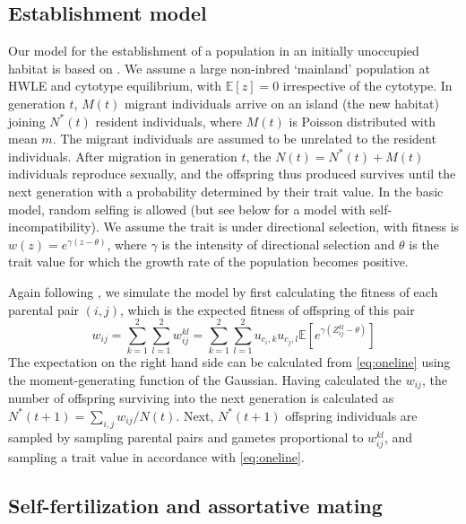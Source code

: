 \documentclass[unnumsec,webpdf,modern,large]{_oup-authoring-template}
\theoremstyle{thmstyleone}%
\theoremstyle{thmstyletwo}%
\theoremstyle{thmstylethree}%
\newcommand{\Ex}{\mathbb{E}}
\begin{document}
\subsection*{Establishment model}

Our model for the establishment of a population in an initially unoccupied
habitat is based on \cite{barton2018}.
We assume a large non-inbred `mainland' population at HWLE and cytotype
equilibrium, with $\Ex[z] = 0$ irrespective of the cytotype.
In generation $t$, $M(t)$ migrant individuals arrive on an island (the new
habitat) joining $N^\ast(t)$ resident individuals, where $M(t)$ is Poisson
distributed with mean $m$. 
The migrant individuals are assumed to be unrelated to the resident
individuals.
After migration in generation $t$, the $N(t) = N^\ast(t) + M(t)$ individuals
reproduce sexually, and the offspring thus produced survives until the next
generation with a probability determined by their trait value.
In the basic model, random selfing is allowed (but see below for a model with
self-incompatibility).
We assume the trait is under directional selection, with fitness is $w(z) =
e^{\gamma(z - \theta)}$, where $\gamma$ is the intensity of directional
selection and $\theta$ is the trait value for which the growth rate of the
population becomes positive.

Again following \cite{barton2018}, we simulate the model by first calculating
the fitness of each parental pair $(i,j)$, which is the expected fitness of
offspring of this pair
\begin{equation}
  w_{ij}
    = \sum_{k=1}^2\sum_{l=1}^2 w_{ij}^{kl}
    = \sum_{k=1}^2\sum_{l=1}^2 u_{c_{i},k}u_{c_{j},l}
        \Ex\left[e^{\gamma(Z_{ij}^{kl} - \theta)}\right]
\end{equation}
The expectation on the right hand side can be calculated from \cref{eq:oneline}
using the moment-generating function of the Gaussian.
Having calculated the $w_{ij}$, the number of offspring surviving into the next
generation is calculated as $N^\ast(t+1) = \sum_{i,j}w_{ij}/N(t)$.
Next, $N^\ast(t+1)$ offspring individuals are sampled by sampling parental
pairs and gametes proportional to $w_{ij}^{kl}$, and sampling a trait value
in accordance with \cref{eq:oneline}. 


\subsection*{Self-fertilization and assortative mating}
\end{document}
